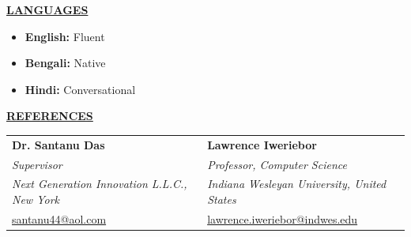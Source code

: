 \documentclass[10.5pt,letterpaper]{article}
\newcommand{\sectiontitle}[1]{\vspace{7pt}\noindent\underline{\textbf{#1}}\vspace{5pt}\par}
\begin{document}
\sectiontitle{LANGUAGES}
\begin{itemize}
  \item \textbf{English:} Fluent
  \item \textbf{Bengali:} Native
  \item \textbf{Hindi:} Conversational
\end{itemize}

\sectiontitle{REFERENCES}

\noindent
\begin{tabularx}{\linewidth}{@{} X X @{}}
  \textbf{Dr. Santanu Das} & \textbf{Lawrence Iweriebor} \\
  \textit{Supervisor} & \textit{Professor, Computer Science} \\
  \textit{Next Generation Innovation L.L.C., New York} & \textit{Indiana Wesleyan University, United States} \\
  \href{mailto:santanu44@aol.com}{santanu44@aol.com} & \href{mailto:lawrence.iweriebor@indwes.edu}{lawrence.iweriebor@indwes.edu} \\
\end{tabularx}
\end{document}
